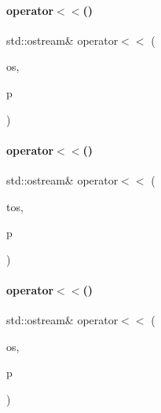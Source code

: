 \mbox{\label{_parts_8cpp_aa5927379449df3d8bbc27e025c5d148f}} 
\paragraph{\texorpdfstring{operator$<$$<$()}{operator<<()}\hspace{0.1cm}{\footnotesize\ttfamily [13/20]}}
{\footnotesize\ttfamily std\+::ostream\& operator$<$$<$ (\begin{DoxyParamCaption}\item[{std\+::ostream \&}]{os,  }\item[{const \mbox{\hyperlink{class_p_s_u}{P\+SU}} \&}]{p }\end{DoxyParamCaption})}

\mbox{\label{_parts_8cpp_a4ba52014f911426a8b686e368603f396}} 
\paragraph{\texorpdfstring{operator$<$$<$()}{operator<<()}\hspace{0.1cm}{\footnotesize\ttfamily [14/20]}}
{\footnotesize\ttfamily std\+::ostream\& operator$<$$<$ (\begin{DoxyParamCaption}\item[{\mbox{\hyperlink{structutos__ostream}{utos\+\_\+ostream}}}]{tos,  }\item[{const \mbox{\hyperlink{class_p_s_u}{P\+SU}} \&}]{p }\end{DoxyParamCaption})}

\mbox{\label{_parts_8cpp_a83138f021cbea0af0a56c70cdb1e0454}} 
\paragraph{\texorpdfstring{operator$<$$<$()}{operator<<()}\hspace{0.1cm}{\footnotesize\ttfamily [15/20]}}
{\footnotesize\ttfamily std\+::ostream\& operator$<$$<$ (\begin{DoxyParamCaption}\item[{std\+::ostream \&}]{os,  }\item[{const \mbox{\hyperlink{class_storage}{Storage}} \&}]{p }\end{DoxyParamCaption})}

